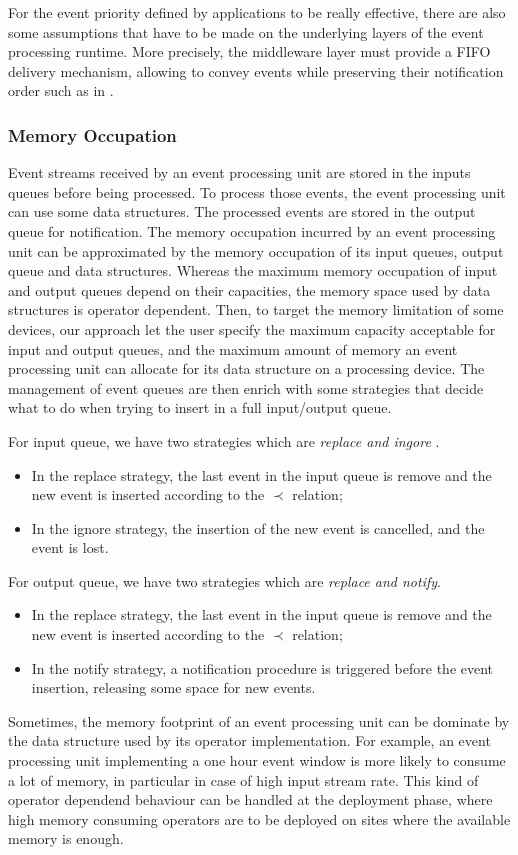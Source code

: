 \documentclass[a4paper,twoside]{article}
\begin{document}
For the event priority defined by applications to be really effective, there are also some assumptions that have to be made on the underlying layers of the event processing runtime. More precisely, the middleware layer must provide a FIFO delivery mechanism, allowing to convey events while preserving their notification order such as in \cite{Chockler2001,Malekpour2011}.
\subsubsection{Memory Occupation}
Event streams received by an event processing unit are stored in the inputs queues before being processed. To process those events, the event processing unit can use some data structures. The processed events are stored in the output queue for notification. The memory occupation incurred by an event processing unit can be approximated by the memory occupation of its input queues, output queue and data structures. Whereas the maximum memory occupation of input and output queues depend on their capacities, the memory space used by data structures is operator dependent. Then, to target the memory limitation of some devices, our approach let the user specify the maximum capacity acceptable for input and output queues, and the maximum amount of memory an event processing unit can allocate for its data structure on a processing device. The management of event queues are then enrich with some strategies that decide what to do when trying to insert in a full input/output queue.

For input queue, we have two strategies which are \textit{replace and ingore }.
\begin{itemize}
\item In the replace strategy, the last event in the input queue is remove and the new event is inserted according to the $\prec$ relation;
\item In the ignore strategy, the insertion of the new event is cancelled, and the event is lost.
\end{itemize} 

For output queue, we have two strategies which are \textit{replace and notify}.
\begin{itemize}
\item In the replace strategy, the last event in the input queue is remove and the new event is inserted according to the $\prec$ relation;
\item In the notify strategy, a notification procedure is triggered before the event insertion, releasing some space for new events. 
\end{itemize} 
Sometimes, the memory footprint of an event processing unit can be dominate by the data structure used by its operator implementation. For example, an event processing unit implementing a one hour event window is more likely to consume a lot of memory, in particular in case of high input stream rate. This kind of operator dependend behaviour can be handled at the deployment phase, where high memory consuming operators are to be deployed on sites where the available memory is enough.    
\end{document}
